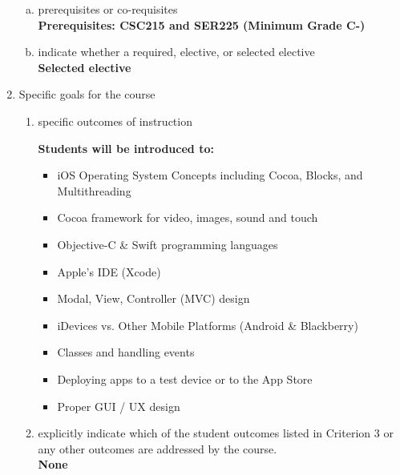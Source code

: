 \begin{enumerate}[1.]
\begin{enumerate}[a.]
\item prerequisites or co-requisites\\
  {\bfseries
    Prerequisites: CSC215 and SER225 (Minimum Grade C-)
  }

\item indicate whether a required, elective, or selected elective\\ %
  {\bfseries
    Selected elective
  }

\end{enumerate}

\item Specific goals for the course
\begin{enumerate}
\item specific outcomes of instruction\\ %
  {\bfseries
    Students will be introduced to:
    \begin{itemize}
      \item iOS Operating System Concepts including Cocoa, Blocks, and Multithreading
      \item Cocoa framework for video, images, sound and touch
      \item Objective-C \& Swift programming languages
      \item Apple’s IDE (Xcode)
      \item Modal, View, Controller (MVC) design
      \item iDevices vs. Other Mobile Platforms (Android \& Blackberry)
      \item Classes and handling events
      \item Deploying apps to a test device or to the App Store
      \item Proper GUI / UX design
    \end{itemize}
  }

\item explicitly indicate which of the student outcomes listed in Criterion 3 or any other outcomes are addressed by the course.\\
  {\bfseries
    None
  }
\end{enumerate}


\end{enumerate}

